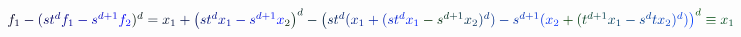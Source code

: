 \documentclass[12pt]{article}
\begin{document}
\makeatletter
\renewcommand*{\@textcolor}[3]{%
  \protect\leavevmode
  \begingroup
    \color#1{#2}#3%
  \endgroup
}
\makeatother
\begin{displaymath}
\begin{array} {c} \mathcolor[RGB]{0,0,15}{\textstyle} { \mathcolor[RGB]{0,0,30}{f} _ { \mathcolor[RGB]{0,0,45}{1} } \mathcolor[RGB]{0,0,60}{-} \mathcolor[RGB]{0,0,75}{(} \mathcolor[RGB]{0,0,90}{s} \mathcolor[RGB]{0,0,105}{t} ^ { \mathcolor[RGB]{0,0,120}{d} } \mathcolor[RGB]{0,0,135}{f} _ { \mathcolor[RGB]{0,0,150}{1} } \mathcolor[RGB]{0,0,165}{-} \mathcolor[RGB]{0,0,180}{s} ^ { \mathcolor[RGB]{0,0,195}{d} \mathcolor[RGB]{0,0,210}{+} \mathcolor[RGB]{0,0,225}{1} } \mathcolor[RGB]{0,0,240}{f} _ { \mathcolor[RGB]{0,0,255}{2} } \mathcolor[RGB]{0,15,0}{)} ^ { \mathcolor[RGB]{0,15,15}{d} } \mathcolor[RGB]{0,15,30}{=} \mathcolor[RGB]{0,15,45}{x} _ { \mathcolor[RGB]{0,15,60}{1} } \mathcolor[RGB]{0,15,75}{+} \mathcolor[RGB]{0,15,90}{\left(} \mathcolor[RGB]{0,15,105}{s} \mathcolor[RGB]{0,15,120}{t} ^ { \mathcolor[RGB]{0,15,135}{d} } \mathcolor[RGB]{0,15,150}{x} _ { \mathcolor[RGB]{0,15,165}{1} } \mathcolor[RGB]{0,15,180}{-} \mathcolor[RGB]{0,15,195}{s} ^ { \mathcolor[RGB]{0,15,210}{d} \mathcolor[RGB]{0,15,225}{+} \mathcolor[RGB]{0,15,240}{1} } \mathcolor[RGB]{0,15,255}{x} _ { \mathcolor[RGB]{0,30,0}{2} } \mathcolor[RGB]{0,30,15}{\right)} ^ { \mathcolor[RGB]{0,30,30}{d} } \mathcolor[RGB]{0,30,45}{-} \mathcolor[RGB]{0,30,60}{\left(} \mathcolor[RGB]{0,30,75}{s} \mathcolor[RGB]{0,30,90}{t} ^ { \mathcolor[RGB]{0,30,105}{d} } \mathcolor[RGB]{0,30,120}{(} \mathcolor[RGB]{0,30,135}{x} _ { \mathcolor[RGB]{0,30,150}{1} } \mathcolor[RGB]{0,30,165}{+} \mathcolor[RGB]{0,30,180}{(} \mathcolor[RGB]{0,30,195}{s} \mathcolor[RGB]{0,30,210}{t} ^ { \mathcolor[RGB]{0,30,225}{d} } \mathcolor[RGB]{0,30,240}{x} _ { \mathcolor[RGB]{0,30,255}{1} } \mathcolor[RGB]{0,45,0}{-} \mathcolor[RGB]{0,45,15}{s} ^ { \mathcolor[RGB]{0,45,30}{d} \mathcolor[RGB]{0,45,45}{+} \mathcolor[RGB]{0,45,60}{1} } \mathcolor[RGB]{0,45,75}{x} _ { \mathcolor[RGB]{0,45,90}{2} } \mathcolor[RGB]{0,45,105}{)} ^ { \mathcolor[RGB]{0,45,120}{d} } \mathcolor[RGB]{0,45,135}{)} \mathcolor[RGB]{0,45,150}{-} \mathcolor[RGB]{0,45,165}{s} ^ { \mathcolor[RGB]{0,45,180}{d} \mathcolor[RGB]{0,45,195}{+} \mathcolor[RGB]{0,45,210}{1} } \mathcolor[RGB]{0,45,225}{(} \mathcolor[RGB]{0,45,240}{x} _ { \mathcolor[RGB]{0,45,255}{2} } \mathcolor[RGB]{0,60,0}{+} \mathcolor[RGB]{0,60,15}{(} \mathcolor[RGB]{0,60,30}{t} ^ { \mathcolor[RGB]{0,60,45}{d} \mathcolor[RGB]{0,60,60}{+} \mathcolor[RGB]{0,60,75}{1} } \mathcolor[RGB]{0,60,90}{x} _ { \mathcolor[RGB]{0,60,105}{1} } \mathcolor[RGB]{0,60,120}{-} \mathcolor[RGB]{0,60,135}{s} ^ { \mathcolor[RGB]{0,60,150}{d} } \mathcolor[RGB]{0,60,165}{t} \mathcolor[RGB]{0,60,180}{x} _ { \mathcolor[RGB]{0,60,195}{2} } \mathcolor[RGB]{0,60,210}{)} ^ { \mathcolor[RGB]{0,60,225}{d} } \mathcolor[RGB]{0,60,240}{)} \mathcolor[RGB]{0,60,255}{\right)} ^ { \mathcolor[RGB]{0,75,0}{d} } \mathcolor[RGB]{0,75,15}{\equiv} \mathcolor[RGB]{0,75,30}{x} _ { \mathcolor[RGB]{0,75,45}{1} } } \end{array}
\end{displaymath}
\end{document}
